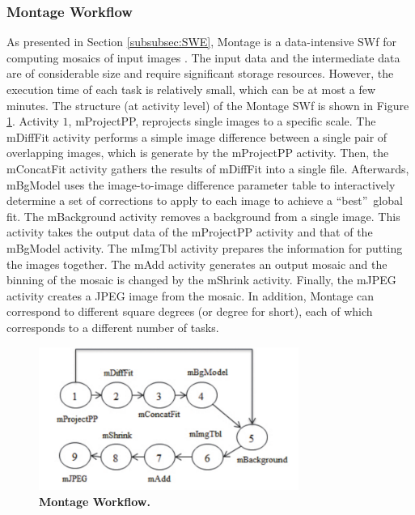 \subsubsection{Montage Workflow}
As presented in Section \ref{subsubsec:SWE}, Montage is a data-intensive SWf for computing mosaics of input images \cite{Deelman2008}.  The input data and the intermediate data are of considerable size and require significant storage resources. However, the execution time of each task is relatively small, which can be at most a few minutes. The structure (at activity level) of the Montage SWf is shown in Figure \ref{fig:montage}. Activity $1$, mProjectPP, reprojects single images to a specific scale. The mDiffFit activity performs a simple image difference between a single pair of overlapping images, which is generate by the mProjectPP activity. Then, the mConcatFit activity gathers the results of mDiffFit into a single file. Afterwards, mBgModel uses the image-to-image difference parameter table to interactively determine a set of corrections to apply to each image to achieve a \textquotedblleft best\textquotedblright ~global fit. The mBackground activity removes a background from a single image. This activity takes the output data of the mProjectPP activity and that of the mBgModel activity. The mImgTbl activity prepares the information for putting the images together. The mAdd activity generates an output mosaic and the binning of the mosaic is changed by the mShrink activity. Finally, the mJPEG activity creates a JPEG image from the mosaic. In addition, Montage can correspond to different square degrees \cite{Deelman2008} (or degree for short), each of which corresponds to a different number of tasks. 

\begin{figure}
\begin{centering}
\captionsetup{justification=centering}
\includegraphics[width=85mm]{figures/Montage}
\par\end{centering}
\caption{\textbf{Montage Workflow.}}
\label{fig:montage}
\end{figure}


